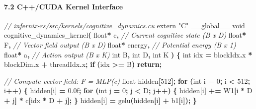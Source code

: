 \documentclass[
  11pt,
  a4paper,
]{article}
\newenvironment{Shaded}{\begin{snugshade}}{\end{snugshade}}
\newcommand{\AttributeTok}[1]{\textcolor[rgb]{0.13,0.29,0.53}{#1}}
\newcommand{\BuiltInTok}[1]{#1}
\newcommand{\CommentTok}[1]{\textcolor[rgb]{0.56,0.35,0.01}{\textit{#1}}}
\newcommand{\ControlFlowTok}[1]{\textcolor[rgb]{0.13,0.29,0.53}{\textbf{#1}}}
\newcommand{\DataTypeTok}[1]{\textcolor[rgb]{0.13,0.29,0.53}{#1}}
\newcommand{\DecValTok}[1]{\textcolor[rgb]{0.00,0.00,0.81}{#1}}
\newcommand{\FloatTok}[1]{\textcolor[rgb]{0.00,0.00,0.81}{#1}}
\newcommand{\NormalTok}[1]{#1}
\newcommand{\OperatorTok}[1]{\textcolor[rgb]{0.81,0.36,0.00}{\textbf{#1}}}
\newcommand{\StringTok}[1]{\textcolor[rgb]{0.31,0.60,0.02}{#1}}
\begin{document}
\paragraph{7.2 C++/CUDA Kernel Interface}\label{ccuda-kernel-interface}

\begin{Shaded}
\begin{Highlighting}[]
\CommentTok{// infernix{-}rs/src/kernels/cognitive\_dynamics.cu}
\AttributeTok{extern} \StringTok{"C"}\NormalTok{ \_\_global\_\_ }\DataTypeTok{void}
\NormalTok{cognitive\_dynamics\_kernel}\OperatorTok{(}
    \DataTypeTok{float}\OperatorTok{*}\NormalTok{ c}\OperatorTok{,}          \CommentTok{// Current cognitive state (B x D)}
    \DataTypeTok{float}\OperatorTok{*}\NormalTok{ F}\OperatorTok{,}          \CommentTok{// Vector field output (B x D)}
    \DataTypeTok{float}\OperatorTok{*}\NormalTok{ energy}\OperatorTok{,}     \CommentTok{// Potential energy (B x 1)}
    \DataTypeTok{float}\OperatorTok{*}\NormalTok{ a}\OperatorTok{,}          \CommentTok{// Action output (B x K)}
    \DataTypeTok{int}\NormalTok{ B}\OperatorTok{,} \DataTypeTok{int}\NormalTok{ D}\OperatorTok{,} \DataTypeTok{int}\NormalTok{ K}
\OperatorTok{)} \OperatorTok{\{}
    \DataTypeTok{int}\NormalTok{ idx }\OperatorTok{=}\NormalTok{ blockIdx}\OperatorTok{.}\NormalTok{x }\OperatorTok{*}\NormalTok{ blockDim}\OperatorTok{.}\NormalTok{x }\OperatorTok{+}\NormalTok{ threadIdx}\OperatorTok{.}\NormalTok{x}\OperatorTok{;}
    \ControlFlowTok{if} \OperatorTok{(}\NormalTok{idx }\OperatorTok{\textgreater{}=}\NormalTok{ B}\OperatorTok{)} \ControlFlowTok{return}\OperatorTok{;}
    
    \CommentTok{// Compute vector field: F = MLP(c)}
    \DataTypeTok{float}\NormalTok{ hidden}\OperatorTok{[}\DecValTok{512}\OperatorTok{];}
    \ControlFlowTok{for} \OperatorTok{(}\DataTypeTok{int}\NormalTok{ i }\OperatorTok{=} \DecValTok{0}\OperatorTok{;}\NormalTok{ i }\OperatorTok{\textless{}} \DecValTok{512}\OperatorTok{;}\NormalTok{ i}\OperatorTok{++)} \OperatorTok{\{}
\NormalTok{        hidden}\OperatorTok{[}\NormalTok{i}\OperatorTok{]} \OperatorTok{=} \FloatTok{0.0}\BuiltInTok{f}\OperatorTok{;}
        \ControlFlowTok{for} \OperatorTok{(}\DataTypeTok{int}\NormalTok{ j }\OperatorTok{=} \DecValTok{0}\OperatorTok{;}\NormalTok{ j }\OperatorTok{\textless{}}\NormalTok{ D}\OperatorTok{;}\NormalTok{ j}\OperatorTok{++)} \OperatorTok{\{}
\NormalTok{            hidden}\OperatorTok{[}\NormalTok{i}\OperatorTok{]} \OperatorTok{+=}\NormalTok{ W1}\OperatorTok{[}\NormalTok{i }\OperatorTok{*}\NormalTok{ D }\OperatorTok{+}\NormalTok{ j}\OperatorTok{]} \OperatorTok{*}\NormalTok{ c}\OperatorTok{[}\NormalTok{idx }\OperatorTok{*}\NormalTok{ D }\OperatorTok{+}\NormalTok{ j}\OperatorTok{];}
        \OperatorTok{\}}
\NormalTok{        hidden}\OperatorTok{[}\NormalTok{i}\OperatorTok{]} \OperatorTok{=}\NormalTok{ gelu}\OperatorTok{(}\NormalTok{hidden}\OperatorTok{[}\NormalTok{i}\OperatorTok{]} \OperatorTok{+}\NormalTok{ b1}\OperatorTok{[}\NormalTok{i}\OperatorTok{]);}
    \OperatorTok{\}}
    

\end{Highlighting}
\end{Shaded}
\end{document}
